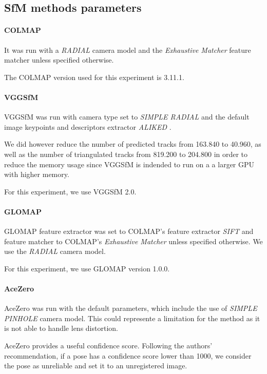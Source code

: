 \subsection{SfM methods parameters}
\paragraph{COLMAP}
It was run with a \textit{RADIAL} camera model and the \textit{Exhaustive Matcher} feature matcher unless specified otherwise.

The COLMAP version used for this experiment is 3.11.1.

\paragraph{VGGSfM}
VGGSfM was run with camera type set to \textit{SIMPLE RADIAL} and the default image keypoints and descriptors extractor \textit{ALIKED} \cite{Zhao2023ALIKED}.

We did however reduce the number of predicted tracks from 163.840 to 40.960, as well as the number of triangulated tracks from 819.200 to 204.800 
in order to reduce the memory usage since VGGSfM is indended to run on a a larger GPU with higher memory.

For this experiment, we use VGGSfM 2.0.

\paragraph{GLOMAP}
GLOMAP feature extractor was set to COLMAP's feature extractor \textit{SIFT} \cite{Lowe2004DistinctiveIF} and feature matcher to COLMAP's \textit{Exhaustive Matcher} unless specified otherwise.
We use the \textit{RADIAL} camera model.

For this experiment, we use GLOMAP version 1.0.0.

\paragraph{AceZero}\label{sec:acezero-parameters}
AceZero was run with the default parameters, which include the use of \textit{SIMPLE PINHOLE} camera model. 
This could represente a limitation for the method as it is not able to handle lens distortion.

AceZero provides a useful confidence score. Following the authors' recommendation, if a pose has a confidence score lower than 1000, we consider the pose as unreliable and set it to an unregistered image.

